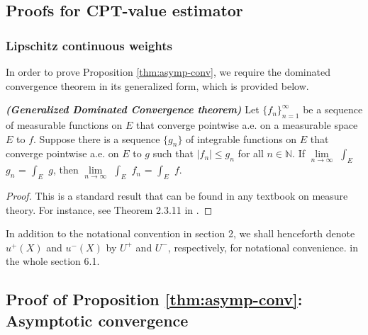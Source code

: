 

\subsection{Proofs for CPT-value estimator}
\label{appendix:cpt-est}

\subsubsection{Lipschitz continuous weights}
In order to prove Proposition \ref{thm:asymp-conv}, we require the dominated convergence theorem in its generalized form, which is provided below.
\begin{theorem}{\textbf{\textit{(Generalized Dominated Convergence theorem)}}}
Let $\{f_n\}_{n=1}^\infty$ be a sequence of measurable functions on $E$ that converge pointwise a.e. on a measurable space $E$ to $f$.  Suppose there is a sequence $\{g_n\}$ of integrable functions on $E$ that converge pointwise a.e. on $E$ to $g$ such that $|f_n| \leq g_n$ for all $n \in \mathbb{N}$.  
If $\lim\limits_{n \rightarrow \infty}$ $\int_E$ $g_n$ = $\int_E$ $g$, then $\lim\limits_{n \rightarrow \infty}$ $\int_E$ $f_n$ = $\int_E$ $f$.
\end{theorem}


\begin{proof}
This is a standard result that can be found in any textbook on measure theory. For instance, see Theorem 2.3.11 in \cite{athreya2006measure}.
\end{proof}

In addition to the notational convention in section 2, we shall henceforth denote $u^+(X)$ and $u^-(X)$ by $U^+$ and $U^-$, respectively, for notational convenience. 
in the whole section 6.1.
\subsection*{Proof of Proposition \ref{thm:asymp-conv}: Asymptotic convergence}
 
